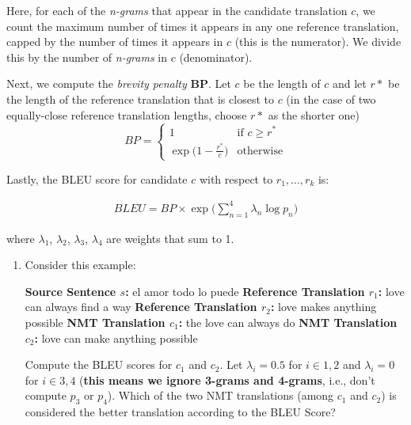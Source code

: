 \begin{enumerate}[1.]
Here, for each of the {\em n-grams} that appear in the candidate translation $c$, we count the maximum number of times it appears in any one reference translation, capped by the number of times it appears in $c$ (this is the numerator). We divide this by the number of {\em n-grams} in $c$ (denominator).

Next, we compute the {\em brevity penalty} {\bf BP}. Let $c$ be the length of $c$ and let $r*$ be the length of the reference translation that is closest to $c$ (in the case of two equally-close reference translation lengths, choose $r*$ as the shorter one)
\begin{equation*}
    BP = 
    \begin{cases}
        1 & \text{if } c \ge r^* \\
        \exp \big( 1 - \frac{r^*}{c} \big) & \text{otherwise}
    \end{cases}
\end{equation*}

Lastly, the BLEU score for candidate $c$ with respect to $r_1,...,r_k$ is:

\begin{align}
BLEU = BP \times \exp \Big( \sum_{n=1}^4 \lambda_n \log p_n \Big)
\end{align}

where $\lambda_1$, $\lambda_2$, $\lambda_3$, $\lambda_4$ are weights that sum to 1.

\begin{enumerate}[4a.]
\item {}
Consider this example:

{\bf Source Sentence $s$:} el amor todo lo puede 
\newline
{\bf Reference Translation $r_1$:} love can always find a way
\newline
{\bf Reference Translation $r_2$:} love makes anything possible
\newline
{\bf NMT Translation $c_1$:} the love can always do
\newline
{\bf NMT Translation $c_2$:} love can make anything possible
\newline

Compute the BLEU scores for $c_1$ and $c_2$. Let $\lambda_i=0.5$ for $i \in {1 ,2}$ and $\lambda_i=0$ for $i \in {3 ,4}$ ({\bf this means we ignore 3-grams and 4-grams}, i.e., don't compute $p_3$ or $p_4$). Which of the two NMT translations (among $c_1$ and $c_2$) is considered the better translation according to the BLEU Score?


\end{enumerate}
\end{enumerate}
